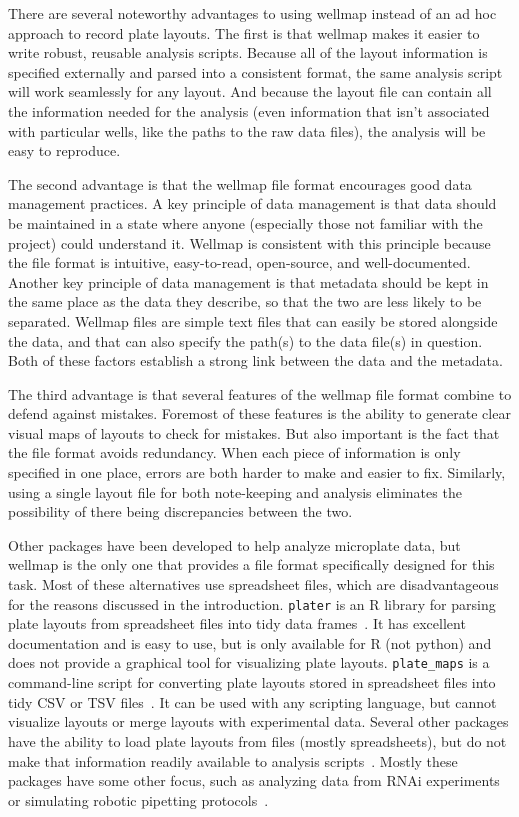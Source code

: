 \documentclass{bmcart}
\begin{document}
There are several noteworthy advantages to using wellmap instead of an ad hoc approach to record plate layouts. The first is that wellmap makes it easier to write robust, reusable analysis scripts. Because all of the layout information is specified externally and parsed into a consistent format, the same analysis script will work seamlessly for any layout. And because the layout file can contain all the information needed for the analysis (even information that isn't associated with particular wells, like the paths to the raw data files), the analysis will be easy to reproduce. 

The second advantage is that the wellmap file format encourages good data management practices. A key principle of data management is that data should be maintained in a state where anyone (especially those not familiar with the project) could understand it. Wellmap is consistent with this principle because the file format is intuitive, easy-to-read, open-source, and well-documented. Another key principle of data management is that metadata should be kept in the same place as the data they describe, so that the two are less likely to be separated. Wellmap files are simple text files that can easily be stored alongside the data, and that can also specify the path(s) to the data file(s) in question. Both of these factors establish a strong link between the data and the metadata. 

The third advantage is that several features of the wellmap file format combine to defend against mistakes. Foremost of these features is the ability to generate clear visual maps of layouts to check for mistakes. But also important is the fact that the file format avoids redundancy. When each piece of information is only specified in one place, errors are both harder to make and easier to fix. Similarly, using a single layout file for both note-keeping and analysis eliminates the possibility of there being discrepancies between the two.

Other packages have been developed to help analyze microplate data, but wellmap is the only one that provides a file format specifically designed for this task.  Most of these alternatives use spreadsheet files, which are disadvantageous for the reasons discussed in the introduction.  \texttt{plater} is an R library for parsing plate layouts from spreadsheet files into tidy data frames~\cite{hughes2020}.  It has excellent documentation and is easy to use, but is only available for R (not python) and does not provide a graphical tool for visualizing plate layouts.    \texttt{plate\_maps} is a command-line script for converting plate layouts stored in spreadsheet files into tidy CSV or TSV files~\cite{jones2014}.  It can be used with any scripting language, but cannot visualize layouts or merge layouts with experimental data.  Several other packages have the ability to load plate layouts from files (mostly spreadsheets), but do not make that information readily available to analysis scripts~\cite{boutros2006,zulkower2016,bernard2017}.  Mostly these packages have some other focus, such as analyzing data from RNAi experiments~\cite{boutros2006} or simulating robotic pipetting protocols~\cite{zulkower2016}.
\end{document}
